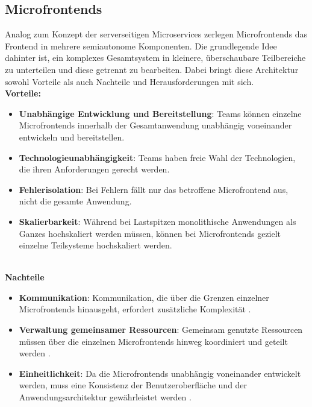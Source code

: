 \subsection{Microfrontends} \label{sec:microfrontends_intro}
Analog zum Konzept der serverseitigen Microservices zerlegen Microfrontends das Frontend in mehrere semiautonome Komponenten. Die grundlegende Idee dahinter ist, ein komplexes Gesamtsystem in kleinere, überschaubare Teilbereiche zu unterteilen und diese getrennt zu bearbeiten. Dabei bringt diese Architektur sowohl Vorteile als auch Nachteile und Herausforderungen mit sich. \\
\textbf{Vorteile:}
\begin{itemize}
  \item \textbf{Unabhängige Entwicklung und Bereitstellung}: Teams können einzelne Microfrontends innerhalb der Gesamtanwendung unabhängig voneinander entwickeln und bereitstellen.
  \item \textbf{Technologieunabhängigkeit}: Teams haben freie Wahl der Technologien, die ihren Anforderungen gerecht werden.
  \item \textbf{Fehlerisolation}: Bei Fehlern fällt nur das betroffene Microfrontend aus, nicht die gesamte Anwendung.
  \item \textbf{Skalierbarkeit}: Während bei Lastspitzen monolithische Anwendungen als Ganzes hochskaliert werden müssen, können bei Microfrontends gezielt einzelne Teilsysteme hochskaliert werden.
\end{itemize}
\cite[Kap.~2.2.1]{marktl2023micro}\\
\textbf{Nachteile} \\
\begin{itemize}
  \item \textbf{Kommunikation}: Kommunikation, die über die Grenzen einzelner Microfrontends hinausgeht, erfordert zusätzliche Komplexität \cite[Kap.~2.3.1]{marktl2023micro}.
  \item \textbf{Verwaltung gemeinsamer Ressourcen}: Gemeinsam genutzte Ressourcen müssen über die einzelnen Microfrontends hinweg koordiniert und geteilt werden \cite[Kap.~2.3.2]{marktl2023micro}.
  \item \textbf{Einheitlichkeit}: Da die Microfrontends unabhängig voneinander entwickelt werden, muss eine Konsistenz der Benutzeroberfläche und der Anwendungsarchitektur gewährleistet werden \cite[Kap.~1.1]{marktl2023micro}.
\end{itemize}
